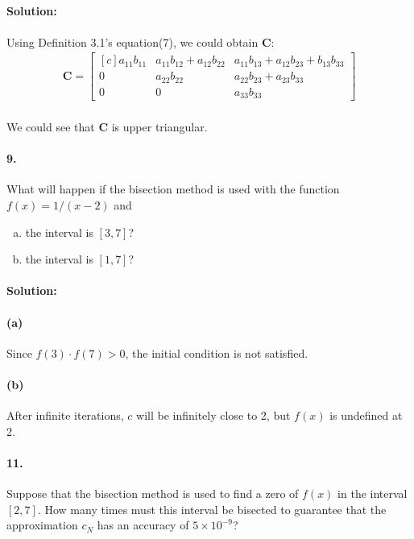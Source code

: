 \documentclass{article}  %
\begin{document}
        \paragraph{Solution:}
        \paragraph{}Using Definition 3.1's equation(7), we could obtain $\mathbf{C}$:
        \begin{align*}
            \mathbf{C} =  \begin{bmatrix*}[c]
            a_{11}b_{11} & a_{11}b_{12} + a_{12}b_{22} & a_{11}b_{13} + a_{12}b_{23} + b_{13}b_{33} \\
            0 & a_{22}b_{22} & a_{22}b_{23} + a_{23}b_{33} \\
            0 & 0 & a_{33}b_{33}
            \end{bmatrix*}
        \end{align*}
        \paragraph{}We could see that $\mathbf{C}$ is upper triangular.
        \paragraph{9.}What will happen if the bisection method is used with the function $f(x) = 1 / (x - 2)$ and
        \begin{enumerate}[(a)]
            \item the interval is $[3, 7]$?
            \item the interval is $[1, 7]$?
        \end{enumerate}
        \paragraph{Solution:}
        \paragraph{(a)}Since $f(3) \cdot f(7) > 0$, the initial condition is not satisfied.
        \paragraph{(b)}After infinite iterations, $c$ will be infinitely close to 2, but $f(x)$ is undefined at 2.
        \paragraph{11.} Suppose that the bisection method is used to find a zero of $f(x)$ in the interval $[2, 7]$. How many times must this interval be bisected to guarantee that the approximation $c_N$ has an accuracy of $5 \times 10^{-9}$?
\end{document}
